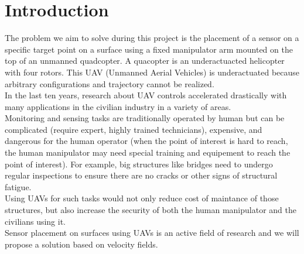 \section{Introduction}




The problem we aim to solve during this project is the placement of a sensor on a specific target point on a surface using a fixed manipulator arm mounted on the top of an unmanned quadcopter.
A quacopter is an underactuacted helicopter with four rotors. This UAV (Unmanned Aerial Vehicles) is underactuated because arbitrary configurations and trajectory cannot be realized.\\
In the last ten years, research about UAV controls accelerated drastically with many applications in the civilian industry in a variety of areas.\\
Monitoring and sensing tasks are traditionally operated by human but can be complicated (require expert, highly trained technicians), expensive,  and dangerous for the human operator (when the point of interest is hard to reach, the human manipulator may need special training and equipement to reach the point of interest). For example, big structures like bridges need to undergo regular inspections to ensure there are no cracks or other signs of structural fatigue.\\
Using UAVs for such tasks would not only reduce cost of maintance of those structures, but also increase the security of both the human manipulator and the civilians using it. \\
Sensor placement on surfaces using UAVs  is an active field of research and we will propose a solution based on velocity fields.\\

